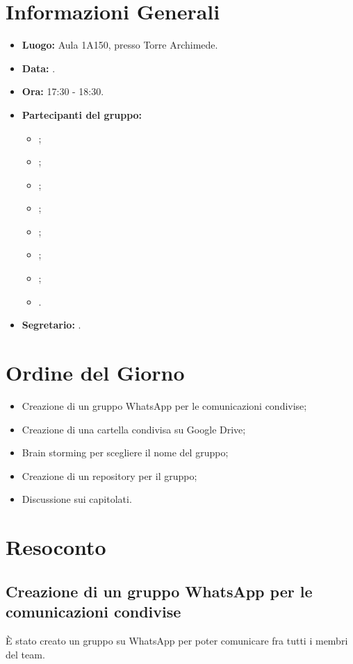 \section{Informazioni Generali}
\begin{itemize}
\item \textbf{Luogo:} Aula 1A150, presso Torre Archimede.
\item \textbf{Data:} \Data.
\item \textbf{Ora:} 17:30 - 18:30.
\item \textbf{Partecipanti del gruppo:}
	\begin{itemize}
		\item \AT{}; 
		\item \BR{};
		\item \CE{}; 
		\item \DF{};
		\item \LD{};
		\item \MC{};
		\item \PF{};
		\item \SE{}.
	\end{itemize} 
\item \textbf{Segretario:} \AT{}.
\end{itemize}


\section{Ordine del Giorno}
\begin{itemize}
	\item Creazione di un gruppo WhatsApp per le comunicazioni condivise; 
	\item Creazione di una cartella condivisa su Google Drive;
	\item Brain storming per scegliere il nome del gruppo;
	\item Creazione di un repository per il gruppo;
	\item Discussione sui capitolati.
\end{itemize}

\section{Resoconto}
\subsection{Creazione di un gruppo WhatsApp per le comunicazioni condivise}
È stato creato un gruppo su WhatsApp per poter comunicare fra tutti i membri del team.

